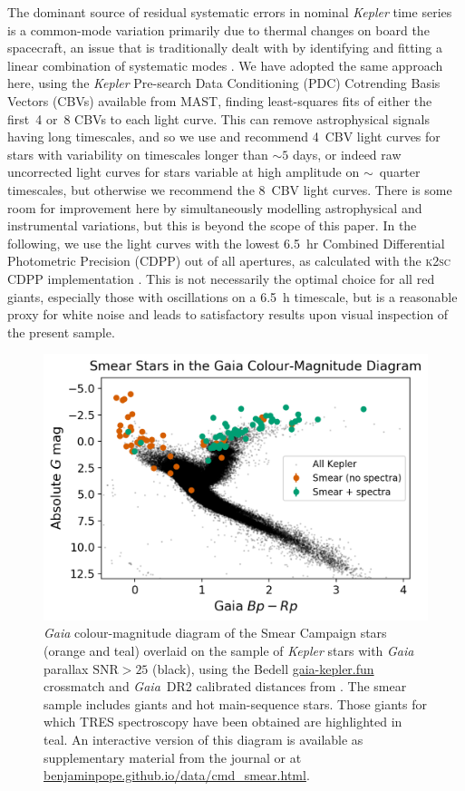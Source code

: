\documentclass[a4paper,fleqn,usenatbib]{mnras}
\newcommand{\kepler}{\textit{Kepler}\xspace}
\newcommand{\gaia}{\textit{Gaia}\xspace}
\begin{document}
The dominant source of residual systematic errors in nominal \kepler time series is a common-mode variation primarily due to thermal changes on board the spacecraft, an issue that is traditionally dealt with by identifying and fitting a linear combination of systematic modes \citep{pdc0,pdc1,pdc2,petigura}. We have adopted the same approach here, using the \kepler Pre-search Data Conditioning (PDC) Cotrending Basis Vectors (CBVs) available from MAST, finding least-squares fits of either the first~4 or~8 CBVs to each light curve. This can remove astrophysical signals having long timescales, and so we use and recommend 4~CBV light curves for stars with variability on timescales longer than $\sim 5$ days, or indeed raw uncorrected light curves for stars variable at high amplitude on $\sim$~quarter timescales, but otherwise we recommend the 8~CBV light curves. There is some room for improvement here by simultaneously modelling astrophysical and instrumental variations, but this is beyond the scope of this paper. In the following, we use the light curves with the lowest 6.5~hr Combined Differential Photometric Precision (CDPP) \citep{cdpp} out of all apertures, as calculated with the \textsc{k2sc} CDPP implementation \citep{k2sc}. This is not necessarily the optimal choice for all red giants, especially those with oscillations on a 6.5~h timescale, but is a reasonable proxy for white noise and leads to satisfactory results upon visual inspection of the present sample.


\begin{figure}
\noindent\includegraphics[width=15cm,keepaspectratio]{gaia_kepler_hr.png}

\caption{\label{hrdiagram}
\gaia colour-magnitude diagram of the Smear Campaign stars (orange and teal) overlaid on the sample of \kepler stars with \gaia parallax $\text{SNR} > 25$ (black), using the Bedell \url{gaia-kepler.fun} crossmatch and \gaia~DR2 calibrated distances from \citet{gaiadists}. The smear sample includes giants and hot main-sequence stars. Those giants for which TRES spectroscopy have been obtained are highlighted in teal. An interactive version of this diagram is available as supplementary material from the journal or at \url{benjaminpope.github.io/data/cmd_smear.html}.}
\end{figure}
\end{document}
